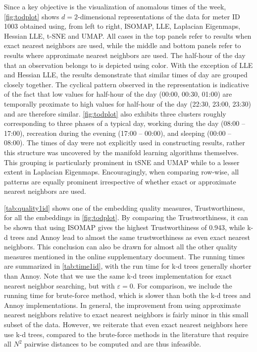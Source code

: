 \documentclass{article}
\begin{document}
Since a key objective is the visualization of anomalous times of the
week, \autoref{fig:todplot} shows \(d=2\)-dimensional representations of
the data for meter ID 1003 obtained using, from left to right, ISOMAP,
LLE, Laplacian Eigenmaps, Hessian LLE, t-SNE and UMAP. All cases in the
top panels refer to results when exact nearest neighbors are used, while
the middle and bottom panels refer to results where approximate nearest
neighbors are used. The half-hour of the day that an observation belongs
to is depicted using color. With the exception of LLE and Hessian LLE,
the results demonstrate that similar times of day are grouped closely
together. The cyclical pattern observed in the representation is
indicative of the fact that low values for half-hour of the day (00:00,
00:30, 01:00) are temporally proximate to high values for half-hour of
the day (22:30, 23:00, 23:30) and are therefore similar.
\autoref{fig:todplot} also exhibits three clusters roughly corresponding
to three phases of a typical day, working during the day (08:00 --
17:00), recreation during the evening (17:00 -- 00:00), and sleeping
(00:00 -- 08:00). The times of day were not explicitly used in
constructing results, rather this structure was uncovered by the
manifold learning algorithms themselves. This grouping is particularly
prominent in tSNE and UMAP while to a lesser extent in Laplacian
Eigenmaps. Encouragingly, when comparing row-wise, all patterns are
equally prominent irrespective of whether exact or approximate nearest
neighbors are used.

\autoref{tab:quality1id} shows one of the embedding quality measures,
Trustworthiness, for all the embeddings in \autoref{fig:todplot}. By
comparing the Trustworthiness, it can be shown that using ISOMAP gives
the highest Trustworthiness of 0.943, while k-d trees and Annoy lead to
almost the same trustworthiness as even exact nearest neighbors. This
conclusion can also be drawn for almost all the other quality measures
mentioned in the online supplementary document. The running times are
summarized in \autoref{tab:time1id}, with the run time for k-d trees
generally shorter than Annoy. Note that we use the same k-d trees
implementation for exact nearest neighbor searching, but with
\(\varepsilon=0\). For comparison, we include the running time for
brute-force method, which is slower than both the k-d trees and Annoy
implementations. In general, the improvement from using approximate
nearest neighbors relative to exact nearest neighbors is fairly minor in
this small subset of the data. However, we reiterate that even exact
nearest neighbors here use k-d trees, compared to the brute-force
methods in the literature that require all \(N^2\) pairwise distances to
be computed and are thus infeasible.
\end{document}
